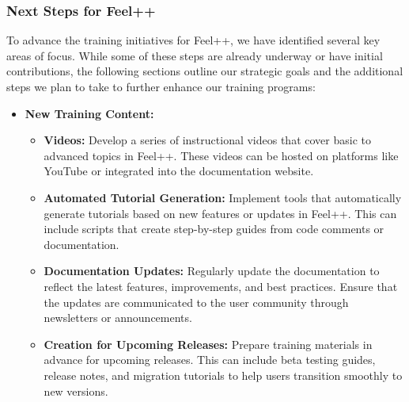 \subsubsection{Next Steps for Feel++}
\label{sec:Feel++:next-steps}

To advance the training initiatives for Feel++, we have identified several key areas of focus.
While some of these steps are already underway or have initial contributions, the following sections outline our strategic goals and the additional steps we plan to take to further enhance our training programs:
\begin{itemize}
    \item \textbf{New Training Content:}
    \begin{itemize}
        \item \textbf{Videos:} Develop a series of instructional videos that cover basic to advanced topics in Feel++. These videos can be hosted on platforms like YouTube or integrated into the documentation website.
        \item \textbf{Automated Tutorial Generation:} Implement tools that automatically generate tutorials based on new features or updates in Feel++. This can include scripts that create step-by-step guides from code comments or documentation.
        \item \textbf{Documentation Updates:} Regularly update the documentation to reflect the latest features, improvements, and best practices. Ensure that the updates are communicated to the user community through newsletters or announcements.
        \item \textbf{Creation for Upcoming Releases:} Prepare training materials in advance for upcoming releases. This can include beta testing guides, release notes, and migration tutorials to help users transition smoothly to new versions.
    \end{itemize}


\end{itemize}
